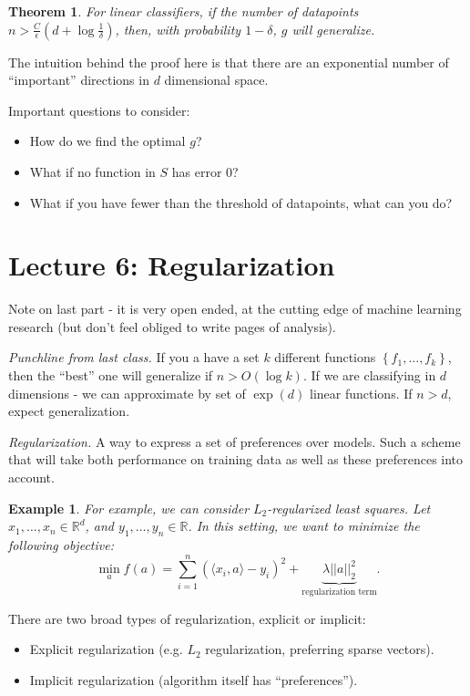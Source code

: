 \documentclass[12pt]{article}
\newtheorem*{theorem}{Theorem}
\newtheorem*{example}{Example}
\newcommand{\RR}{\mathbb{R}}
\newcommand{\eps}{\epsilon}
\begin{document}
\begin{theorem}
  For linear classifiers, if the number of datapoints $n > \frac{C}{\eps} (d + \log \frac{1}{\delta})$, then, with probability $1 - \delta$, $g$ will generalize.
\end{theorem}

The intuition behind the proof here is that there are an exponential number of ``important'' directions in $d$ dimensional space.

Important questions to consider:

\begin{itemize}
  \item How do we find the optimal $g$?
  \item What if no function in $S$ has error 0?
  \item What if you have fewer than the threshold of datapoints, what can you do?
\end{itemize}

\section{Lecture 6: Regularization}

Note on last part - it is very open ended, at the cutting edge of machine learning research (but don't feel obliged to write pages of analysis).

{\it Punchline from last class.} If you a have a set $k$ different functions $\left\{ f_1, \dots, f_k \right\}$, then the ``best'' one will generalize if $n > O(\log k)$.  If we are classifying in $d$ dimensions - we can approximate by set of $\exp (d)$ linear functions.  If $n > d$, expect generalization.

{\it Regularization.} A way to express a set of preferences over models.  Such a scheme that will take both performance on training data as well as these preferences into account. \\

\begin{example}
  For example, we can consider $L_2$-regularized least squares.  Let $x_1, \dots, x_n \in \RR^d$, and $y_1, \dots, y_n \in \RR$.  In this setting, we want to minimize the following objective:
  \[
    \min_{a} f(a) = \sum_{i=1}^{n} \left( \langle x_i, a \rangle - y_i \right)^2 + \underbrace{\lambda ||a||_2^{2}}_{\text{regularization term}}.
  \]
\end{example}

There are two broad types of regularization, explicit or implicit:
\begin{itemize}
  \item Explicit regularization (e.g. $L_2$ regularization, preferring sparse vectors).
  \item Implicit regularization (algorithm itself has ``preferences'').
\end{itemize}
\end{document}
